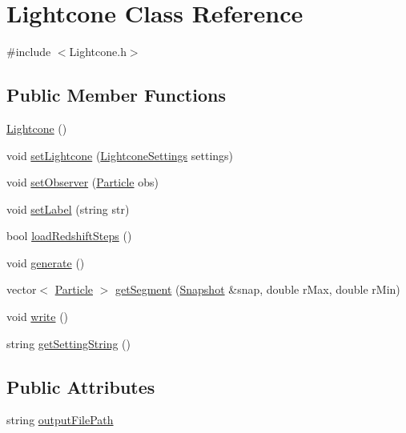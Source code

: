 \hypertarget{classLightcone}{}\section{Lightcone Class Reference}
\label{classLightcone}


{\ttfamily \#include $<$Lightcone.\+h$>$}

\subsection*{Public Member Functions}
\begin{DoxyCompactItemize}
\item 
\hyperlink{classLightcone_a995eaddc1bd40670ba09c6d91314fcc7}{Lightcone} ()
\item 
void \hyperlink{classLightcone_a6cd0b42be0281e70a6ef5e6a2701f587}{set\+Lightcone} (\hyperlink{structLightconeSettings}{Lightcone\+Settings} settings)
\item 
void \hyperlink{classLightcone_a5439f4ef2e9b61101aecd07d4f516de9}{set\+Observer} (\hyperlink{structParticle}{Particle} obs)
\item 
void \hyperlink{classLightcone_a9245eee21d6b57b9d5bf0b1fcc918448}{set\+Label} (string str)
\item 
bool \hyperlink{classLightcone_a4b1c9b9d855cf08cdc4316ba9823d52c}{load\+Redshift\+Steps} ()
\item 
void \hyperlink{classLightcone_a105a489ed768bc9c29acd5239d993c96}{generate} ()
\item 
vector$<$ \hyperlink{structParticle}{Particle} $>$ \hyperlink{classLightcone_a5a9ed81cce84c6602ef722e0398f7f20}{get\+Segment} (\hyperlink{classSnapshot}{Snapshot} \&snap, double r\+Max, double r\+Min)
\item 
void \hyperlink{classLightcone_afcf40a6029a13ec619317b3eea792795}{write} ()
\item 
string \hyperlink{classLightcone_a5a7028a7c597d4a2f64410c0bff997fc}{get\+Setting\+String} ()
\end{DoxyCompactItemize}
\subsection*{Public Attributes}
\begin{DoxyCompactItemize}
\item 
string \hyperlink{classLightcone_a4abb9ce077488d3744e00b1ad4969299}{output\+File\+Path}
\end{DoxyCompactItemize}
